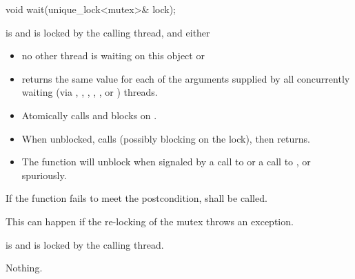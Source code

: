 %
\begin{itemdecl}
void wait(unique_lock<mutex>& lock);
\end{itemdecl}
\begin{itemdescr}
 \pnum \requires {} is  and 
        is locked by the calling thread, and either
        \begin{itemize}
         \item no other thread is waiting on this  object or
         \item {} returns the same value for each of the 
                arguments supplied by all concurrently waiting (via ,
                , 
                {\color{insertcolor}, , , or }) threads.
        \end{itemize}

 \pnum\effects
 \begin{itemize}
        \item Atomically calls  and blocks on .
        \item When unblocked, calls  (possibly blocking on the lock), then returns.
        \item The function will unblock when signaled by a call to 
              or a call to , or spuriously.
 \end{itemize}

 \pnum \remarks
        If the function fails to meet the postcondition, 
        shall be called.
        \begin{note} This can happen if the re-locking of the mutex throws an exception. \end{note}
 
 \pnum \postconditions {} is  and 
        is locked by the calling thread.

 \pnum\throws Nothing.
\end{itemdescr}



